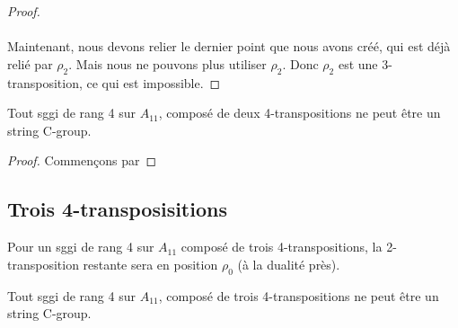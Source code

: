 \begin{proof}
  \paragraph{}
  Maintenant, nous devons relier le dernier point que nous avons créé, qui est déjà relié par $\rho_2$. Mais nous ne pouvons plus utiliser $\rho_2$. Donc $\rho_2$ est une 3-transposition, ce qui est impossible.

\end{proof}

\begin{theorem}
  Tout sggi de rang 4 sur $A_{11}$, composé de deux 4-transpositions ne peut être un string C-group.
\end{theorem}

\begin{proof}
  Commençons par
\end{proof}

\subsection{Trois 4-transposisitions}

\begin{lemma}
  Pour un sggi de rang 4 sur $A_{11}$ composé de trois 4-transpositions, la 2-transposition restante sera en position $\rho_0$ (à la dualité près).
\end{lemma}

\begin{theorem}
  Tout sggi de rang 4 sur $A_{11}$, composé de trois 4-transpositions ne peut être un string C-group.
\end{theorem}

